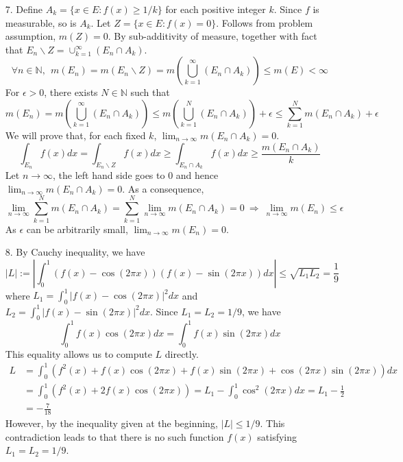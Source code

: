 \begin{itemize}
	\item[7.] Define $A_k = \{x\in E: f(x)\ge 1/k \}$ for each positive integer $k$. Since $f$ is measurable, so is $A_k$. Let $Z=\{x\in E: f(x)=0\}$. Follows from problem assumption, $m(Z)=0$. By sub-additivity of measure, together with fact that $E_n\backslash Z=\cup_{k=1}^\infty (E_n\cap A_k)$.
	$$
	\forall n\in\mathbb{N},~~m\left(E_n\right) = m\left(E_n\backslash Z\right) = m\left(\bigcup_{k=1}^\infty (E_n\cap A_k)\right)\le m(E) < \infty
	$$
	For $\epsilon >0$, there exists $N\in \mathbb{N}$ such that $$
	m(E_n)= m\left(\bigcup_{k=1}^\infty (E_n\cap A_k)\right) \le m\left(\bigcup_{k=1}^N (E_n\cap A_k)\right) + \epsilon\le \sum_{k=1}^N m(E_n\cap A_k) +\epsilon
	$$
	We will prove that, for each fixed $k$, $\lim_{n\rightarrow\infty} m(E_n\cap A_k)=0$.
	$$
	\int_{E_n} f(x)dx = \int_{E_n\backslash Z} f(x)dx\ge \int_{E_n\cap A_k}f(x)dx \ge \frac{m(E_n\cap A_k)}{k}
	$$
	Let $n\rightarrow \infty$, the left hand side goes to $0$ and hence $\lim_{n\rightarrow\infty} m(E_n\cap A_k)=0$. As a consequence,
	$$
	\lim_{n\rightarrow\infty} \sum_{k=1}^N m(E_n\cap A_k) = \sum_{k=1}^N \lim_{n\rightarrow\infty} m(E_n\cap A_k) = 0 ~\Rightarrow~ \lim_{n\rightarrow\infty} m(E_n) \le \epsilon
	$$
	As $\epsilon$ can be arbitrarily small, $\lim_{n\rightarrow\infty} m(E_n) = 0$.
	\item[8.] By Cauchy inequality, we have
	$$
	\left\lvert L \right\rvert := \left\lvert\int_{0}^1  \left(f(x) -\cos(2\pi x)\right)\left(f(x) -\sin(2\pi x)\right) dx \right\rvert \le \sqrt{L_1L_2} = \frac{1}{9}
	$$
	where $L_1 =  \int_{0}^1\left\lvert f(x) -\cos(2\pi x) \right\rvert^2 dx $ and $L_2 =\int_{0}^1\left\lvert f(x) -\sin(2\pi x) \right\rvert^2 dx $. Since $L_1 = L_2 = 1/9$, we have
	$$
	\int_{0}^1 f(x)\cos(2\pi x) dx = \int_{0}^1 f(x)\sin(2\pi x) dx 
	$$
	This equality allows us to compute $L$ directly.
	$$
	\begin{aligned}
	L &= \int_{0}^1 \left( f^2(x)+f(x)\cos(2\pi x) +f(x)\sin(2\pi x)+ \cos(2\pi x)\sin(2\pi x) \right) dx\\
	&= \int_{0}^1\left(f^2(x) + 2f(x)\cos(2\pi x)\right) = L_1 - \int_{0}^1 \cos^2(2\pi x)dx = L_1 - \frac{1}{2}\\
	&= -\frac{7}{18}
	\end{aligned}
	$$
	However, by the inequality given at the beginning, $\lvert L\rvert \le 1/9$. This contradiction leads to that there is no such function $f(x)$ satisfying $L_1=L_2 = 1/9$.
	

\end{itemize}
